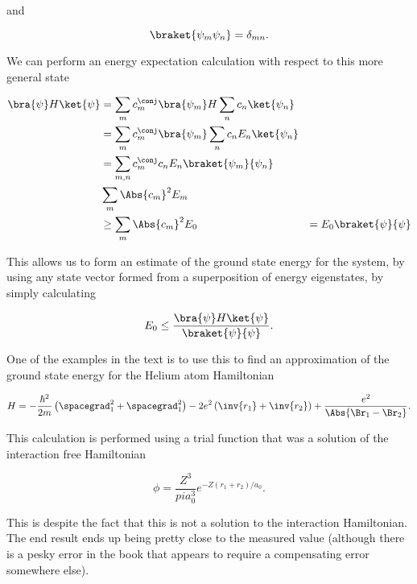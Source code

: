 and

\begin{equation}\label{eqn:variationHarmonicOscillator:50}
\braket{\psi_m \psi_n} = \delta_{mn}.
\end{equation}

We can perform an energy expectation calculation with respect to this more general state

\begin{align*}
\bra{\psi} H \ket{\psi} 
&= 
\sum_m c_{m}^\conj \bra{\psi_m} 
H
\sum_n c_{n} \ket{\psi_n} \\
&=
\sum_m c_{m}^\conj \bra{\psi_m}
\sum_n c_{n} E_n \ket{\psi_n} \\
&=
\sum_{m,n} c_{m}^\conj c_n E_n \braket{\psi_m}{\psi_n} \\
&
\sum_{m} \Abs{c_{m}}^2 E_m \\
&\ge
\sum_{m} \Abs{c_{m}}^2 E_0
&=
E_0 \braket{\psi}{\psi}
\end{align*}

This allows us to form an estimate of the ground state energy for the system, by using any state vector formed from a superposition of energy eigenstates, by simply calculating

\begin{equation}\label{eqn:variationHarmonicOscillator:70}
E_0 \le \frac{\bra{\psi} H \ket{\psi}}{ \braket{\psi}{\psi} }.
\end{equation}

One of the examples in the text is to use this to find an approximation of the ground state energy for the Helium atom Hamiltonian

\begin{equation}\label{eqn:variationHarmonicOscillator:90}
H = 
-\frac{\hbar^2}{2m} \left( 
\spacegrad_1^2
+\spacegrad_1^2\right) - 2 e^2 \left( \inv{r_1} + \inv{r_2} \right) + \frac{e^2}{\Abs{\Br_1 - \Br_2}}.
\end{equation}

This calculation is performed using a trial function that was a solution of the interaction free Hamiltonian

\begin{equation}\label{eqn:variationHarmonicOscillator:110}
\phi = \frac{Z^3}{pi a_0^3} e^{-Z (r_1 + r_2)/a_0 }.
\end{equation}

This is despite the fact that this is not a solution to the interaction Hamiltonian.  The end result ends up being pretty close to the measured value (although there is a pesky error in the book that appears to require a compensating error somewhere else).

